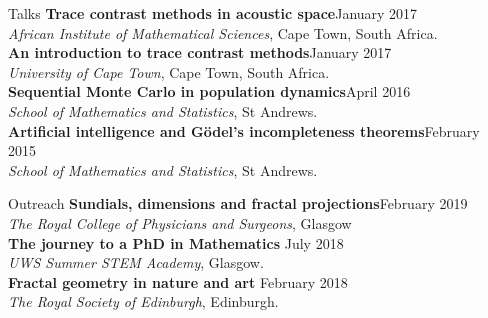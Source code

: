 \documentclass{resume} %
\begin{document}
\begin{rSection}{Talks}
\textbf{Trace contrast methods in acoustic space}\hfill January 2017\\ \emph{African Institute of Mathematical Sciences}, Cape Town, South Africa.  \\
\textbf{An introduction to trace contrast methods}\hfill January 2017 \\ \emph{University of Cape Town}, Cape Town, South Africa.\\
\textbf{Sequential Monte Carlo in population dynamics}\hfill April 2016\\ \emph{School of Mathematics and Statistics}, St Andrews. \\
\textbf{Artificial intelligence and G\"odel's incompleteness theorems}\hfill February 2015 \\ \emph{School of Mathematics and Statistics}, St Andrews. \\
\end{rSection}

\begin{rSection}{Outreach}
\textbf{Sundials, dimensions and fractal projections}\hfill February 2019 \\ \emph{The Royal College of Physicians and Surgeons}, Glasgow  \\
\textbf{The journey to a PhD in Mathematics} \hfill July 2018 \\\emph{UWS Summer STEM Academy}, Glasgow.\\
\textbf{Fractal geometry in nature and art} \hfill February 2018\\ \emph{The Royal Society of Edinburgh}, Edinburgh.\\
\end{rSection}
\end{document}
